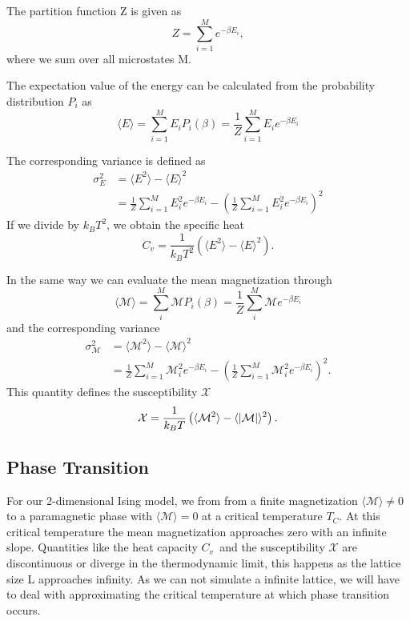 \documentclass[%
reprint,
nofootinbib,
amsmath,amssymb,
aps,
]{revtex4-1}
\begin{document}
The partition function Z is given as 
\begin{equation}\label{eq:Z}
	Z = \sum_{i=1}^{M}e^{-\beta E_i},
\end{equation} 
where we sum over all microstates M.

The expectation value of the energy can be calculated from the probability distribution $P_i$ as 
\begin{equation}\label{eq:E}
	\langle E\rangle = \sum_{i=1}^{M}E_iP_i(\beta) = \frac{1}{Z}\sum_{i=1}^ME_ie^{-\beta E_i}
\end{equation}

The corresponding variance is defined as 
\begin{equation}
	\begin{split}
\sigma_E^2 &= \langle E^2 \rangle -\langle E\rangle^2 \\
&= \frac{1}{Z}\sum_{i=1}^ME_i^2e^{-\beta E_i} - \left(\frac{1}{Z}\sum_{i=1}^ME_i^2e^{-\beta E_i}\right)^2
	\end{split}
\end{equation}
If we divide by $k_BT^2$, we obtain the specific heat 
\begin{equation}\label{eq:cv}
	C_v = \frac{1}{k_BT^2}\left(\langle E^2 \rangle -\langle E\rangle^2\right).
\end{equation}

In the same way we can evaluate the mean magnetization through 
\begin{equation}\label{eq:M}
	\langle\mathcal{M}\rangle = \sum_i^M\mathcal{M}P_i(\beta) = \frac{1}{Z}\sum_i^M\mathcal{M}e^{-\beta E_i}
\end{equation}
and the corresponding variance 
\begin{equation}
\begin{split} 
		\sigma_\mathcal{M}^2			&=\langle \mathcal{M}^2 \rangle -\langle \mathcal{M}\rangle^2 \\
			&= \frac{1}{Z}\sum_{i=1}^M\mathcal{M}_i^2e^{-\beta E_i} - \left(\frac{1}{Z}\sum_{i=1}^M\mathcal{M}_i^2e^{-\beta E_i}\right)^2.
		\end{split} 
\end{equation}
This quantity defines the susceptibility $\mathcal{X}$
\begin{equation}\label{eq:x}
	\mathcal{X} = \frac{1}{k_BT}\left(\langle \mathcal{M}^2 \rangle -\langle \abs{\mathcal{M}}\rangle^2\right).
\end{equation}
\subsection{Phase Transition} %
For our 2-dimensional Ising model, we from from a finite magnetization $\langle \mathcal{M} \rangle \neq 0$ to a paramagnetic phase with $\langle \mathcal{M} \rangle = 0$ at a critical temperature $T_C$. At this critical temperature the mean magnetization approaches zero with an infinite slope. Quantities like the heat capacity $C_v$ and the susceptibility $\mathcal{X}$ are discontinuous or diverge in the thermodynamic limit\cite{morten}, this happens as the lattice size L approaches infinity. As we can not simulate a infinite lattice, we will have to deal with approximating the critical temperature at which phase transition occurs. 
\end{document}
